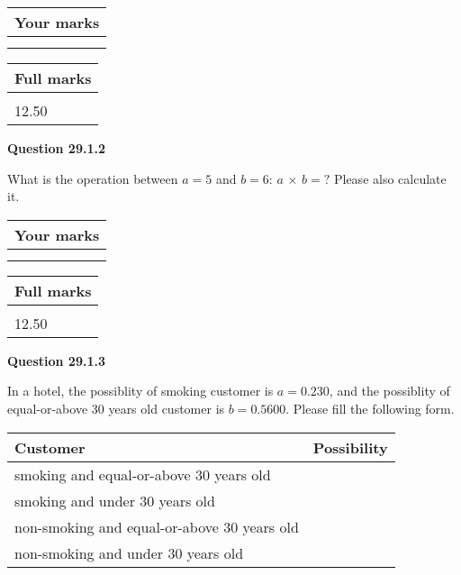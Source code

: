 \documentclass[12pt]{article}
\begin{document}
 
 
 

 
 
\vspace{0.3in}
  
\vspace{0.2in}
  
         \begin{tabular}{|l|}
\hline
 Your marks  \\
\hline
 \\ 
 \\ 
\hline
\end{tabular}
\hspace{0.05in} \begin{tabular}{|l|}
\hline
 Full marks  \\
\hline
 \\ 
12.50 \\
\hline
\end{tabular}
{\textbf{\Large{Question
29.1.2 
}}}
  
  
What is the operation between $a= %
5$ and $b= %
6$:
$a$  %
$\times$ $b=?$ Please also calculate it.

 
\vspace{0.3in}
  
\vspace{0.2in}
  
         \begin{tabular}{|l|}
\hline
 Your marks  \\
\hline
 \\ 
 \\ 
\hline
\end{tabular}
\hspace{0.05in} \begin{tabular}{|l|}
\hline
 Full marks  \\
\hline
 \\ 
12.50 \\
\hline
\end{tabular}
{\textbf{\Large{Question
29.1.3 
}}}
  
  
In a hotel, the possiblity of  %
smoking customer is
$a =  %
0.230$, and the possiblity of  %
equal-or-above 30 years old customer is $ b =  %
0.5600$.
Please fill the following form.
 
\noindent
\begin{tabular}{|l|l|}
\hline
Customer & Possibility \\
\hline
smoking  and   %
equal-or-above 30 years old  & \\
\hline
smoking  and   %
under 30 years old & \\
\hline
 non-smoking and   %
equal-or-above 30 years old  & \\
\hline
 non-smoking and  %
under 30 years old & \\
\hline
\end{tabular}
 
\end{document}
